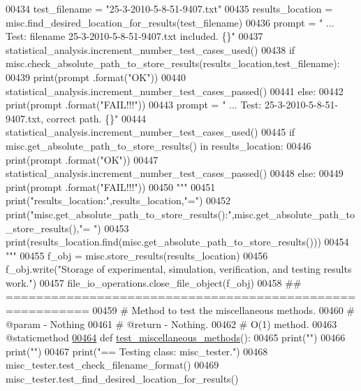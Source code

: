\begin{DoxyCode}
00434         test\_filename = \textcolor{stringliteral}{"25-3-2010-5-8-51-9407.txt"}
00435         results\_location = misc.find\_desired\_location\_for\_results(test\_filename)
00436         prompt = \textcolor{stringliteral}{"  ... Test: filename 25-3-2010-5-8-51-9407.txt included.  \{\}"}
00437         statistical\_analysis.increment\_number\_test\_cases\_used()
00438         \textcolor{keywordflow}{if} misc.check\_absolute\_path\_to\_store\_results(results\_location,test\_filename):
00439             print(prompt .format(\textcolor{stringliteral}{"OK"}))
00440             statistical\_analysis.increment\_number\_test\_cases\_passed()
00441         \textcolor{keywordflow}{else}:
00442             print(prompt .format(\textcolor{stringliteral}{"FAIL!!!"}))
00443         prompt = \textcolor{stringliteral}{"  ... Test: 25-3-2010-5-8-51-9407.txt, correct path.  \{\}"}
00444         statistical\_analysis.increment\_number\_test\_cases\_used()
00445         \textcolor{keywordflow}{if} misc.get\_absolute\_path\_to\_store\_results() \textcolor{keywordflow}{in} results\_location:
00446             print(prompt .format(\textcolor{stringliteral}{"OK"}))
00447             statistical\_analysis.increment\_number\_test\_cases\_passed()
00448         \textcolor{keywordflow}{else}:
00449             print(prompt .format(\textcolor{stringliteral}{"FAIL!!!"}))
00450             \textcolor{stringliteral}{"""}
00451 \textcolor{stringliteral}{            print("results\_location:",results\_location,"=")}
00452 \textcolor{stringliteral}{            print("misc.get\_absolute\_path\_to\_store\_results():",misc.get\_absolute\_path\_to\_store\_results(),"=
      ")}
00453 \textcolor{stringliteral}{            print(results\_location.find(misc.get\_absolute\_path\_to\_store\_results()))}
00454 \textcolor{stringliteral}{            """}
00455         f\_obj = misc.store\_results(results\_location)
00456         f\_obj.write(\textcolor{stringliteral}{"Storage of experimental, simulation, verification, and testing results work."})
00457         file\_io\_operations.close\_file\_object(f\_obj)
00458     \textcolor{comment}{## =========================================================}
00459     \textcolor{comment}{#   Method to test the miscellaneous methods.}
00460     \textcolor{comment}{#   @param - Nothing}
00461     \textcolor{comment}{#   @return - Nothing.}
00462     \textcolor{comment}{#   O(1) method.}
00463     @staticmethod
\hypertarget{miscellaneous__tester_8py_source_l00464}{}\hyperlink{classutilities_1_1miscellaneous__tester_1_1misc__tester_a8a269b66a82f93ee9683ebbf8974ba24}{00464}     \textcolor{keyword}{def }\hyperlink{classutilities_1_1miscellaneous__tester_1_1misc__tester_a8a269b66a82f93ee9683ebbf8974ba24}{test\_miscellaneous\_methods}():
00465         print(\textcolor{stringliteral}{""})
00466         print(\textcolor{stringliteral}{""})
00467         print(\textcolor{stringliteral}{"==   Testing class: misc\_tester."})
00468         misc\_tester.test\_check\_filename\_format()
00469         misc\_tester.test\_find\_desired\_location\_for\_results()
\end{DoxyCode}

